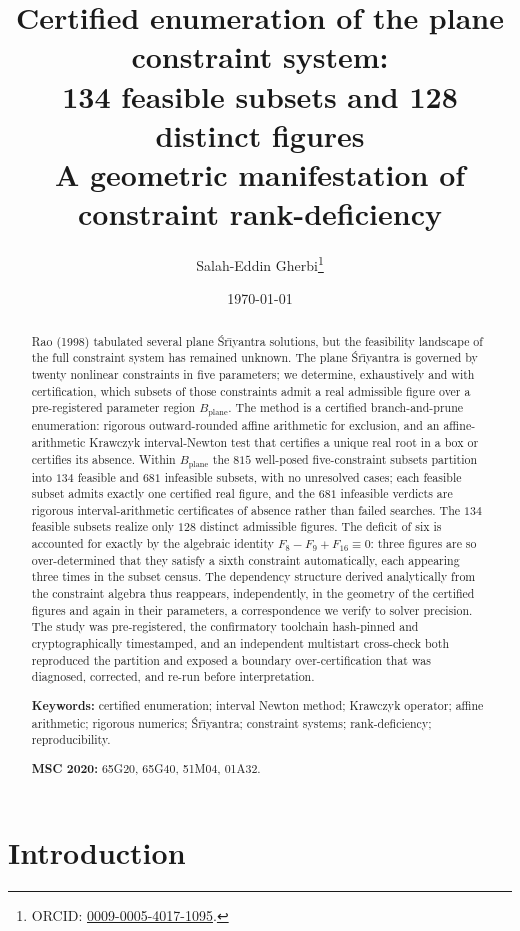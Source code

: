 \documentclass[11pt]{article}
\title{Certified enumeration of the plane \sri{} constraint system:\\
134 feasible subsets and 128 distinct figures\\[6pt]
\large A geometric manifestation of constraint rank-deficiency}
\author{Salah-Eddin Gherbi\thanks{ORCID: \href{https://orcid.org/0009-0005-4017-1095}{0009-0005-4017-1095}.}}
\date{\today}
\newcommand{\sri}{\'Sr\={\i}yantra}
\newcommand{\Bplane}{B_{\mathrm{plane}}}
\begin{document}
\maketitle

\begin{abstract}
\noindent
Rao (1998) tabulated several plane \sri{} solutions, but the feasibility landscape of the full constraint system has remained unknown. The plane \sri{} is governed by twenty nonlinear constraints in five parameters; we determine, exhaustively and with certification, which subsets of those constraints admit a real admissible figure over a pre-registered parameter region $\Bplane$. The method is a certified branch-and-prune enumeration: rigorous outward-rounded affine arithmetic for exclusion, and an affine-arithmetic Krawczyk interval-Newton test that certifies a unique real root in a box or certifies its absence. Within $\Bplane$ the $815$ well-posed five-constraint subsets partition into $134$ feasible and $681$ infeasible subsets, with no unresolved cases; each feasible subset admits exactly one certified real figure, and the $681$ infeasible verdicts are rigorous interval-arithmetic certificates of absence rather than failed searches. The $134$ feasible subsets realize only $128$ distinct admissible figures. The deficit of six is accounted for exactly by the algebraic identity $F_8 - F_9 + F_{16}\equiv 0$: three figures are so over-determined that they satisfy a sixth constraint automatically, each appearing three times in the subset census. The dependency structure derived analytically from the constraint algebra thus reappears, independently, in the geometry of the certified figures and again in their parameters, a correspondence we verify to solver precision. The study was pre-registered, the confirmatory toolchain hash-pinned and cryptographically timestamped, and an independent multistart cross-check both reproduced the partition and exposed a boundary over-certification that was diagnosed, corrected, and re-run before interpretation.

\medskip
\noindent\textbf{Keywords:} certified enumeration; interval Newton method; Krawczyk operator; affine arithmetic; rigorous numerics; \sri{}; constraint systems; rank-deficiency; reproducibility.

\noindent\textbf{MSC 2020:} 65G20, 65G40, 51M04, 01A32.
\end{abstract}

\section{Introduction}
\end{document}
